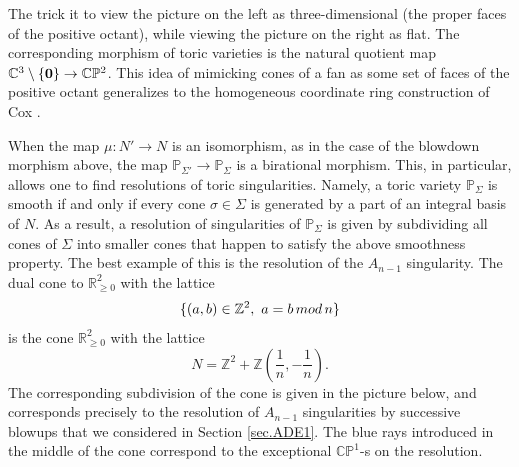 \documentclass[11pt]{article}
\numberwithin{equation}{section}
\numberwithin{footnote}{section}
\renewcommand{\P}{{\mathbb P}}
\newcommand{\R}{{\mathbb R}}
\newcommand{\Z}{{\mathbb Z}}
\newcommand{\C}{{\mathbb C}}
\begin{document}
\hskip -10pt

\noindent
The trick it to view the picture on the left as three-dimensional (the proper faces of the positive octant), while viewing the picture on the right as flat.
The corresponding morphism of toric varieties
is the natural quotient map $\C^3 \setminus \{{\bf 0}\} \to \C\P^2$. This idea of mimicking cones of a fan as some set of faces of the positive octant generalizes to the homogeneous coordinate ring construction of Cox \cite{Cox}.

\smallskip
When the map $\mu:N'\to N$ is an isomorphism, as in the case of the blowdown morphism above, the map
 $\P_{\Sigma'}\to \P_\Sigma$ is a birational morphism. This, in particular, allows one to find resolutions of toric singularities.
Namely, a toric variety $\P_\Sigma$ is smooth if and only if every cone $\sigma\in \Sigma$ is generated by a part of an integral basis of $N$. As a result, a resolution of singularities of $\P_\Sigma$ is given by subdividing all cones of $\Sigma$ into smaller cones that happen to satisfy the above smoothness property.
The best example of this is the resolution of the $A_{n-1}$ singularity. The dual cone to $\R_{\geq 0}^2$ with the lattice
$$
\{(a,b)\in \Z^2,~a=b\,{\rm mod}\,n\}
$$
is the cone $\R_{\geq 0}^2$ with the lattice
$$
N=\Z^2 + \Z(\frac 1n,-\frac 1n).
$$
The corresponding subdivision of the cone is given in the picture below, and corresponds precisely to the 
resolution of $A_{n-1}$ singularities by successive blowups that we considered in Section \ref{sec.ADE1}. The blue rays introduced in the middle of the cone correspond to the exceptional $\C\P^1$-s on the resolution.
\end{document}
